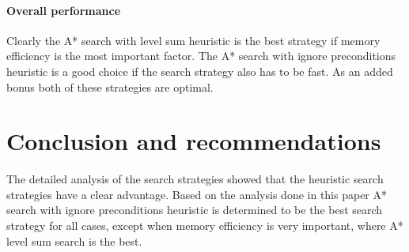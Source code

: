 \documentclass[11pt]{article}
\begin{document}
\paragraph{Overall performance}

Clearly the A* search with level sum heuristic is the best strategy if memory efficiency is the most important factor. The A* search with ignore preconditions heuristic is a good choice if the search strategy also has to be fast. As an added bonus both of these strategies are optimal. 

\section{Conclusion and recommendations}

The detailed analysis of the search strategies showed that the heuristic search strategies have a clear advantage. Based on the analysis done in this paper A* search with ignore preconditions heuristic is determined to be the best search strategy for all cases, except when memory efficiency is very important, where A* level sum search is the best.

\printbibliography
\end{document}
